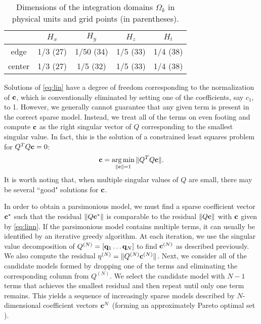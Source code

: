 \documentclass[
 reprint,
 amsmath,amssymb,
 aps,
]{revtex4-2}
\DeclareMathOperator*{\argmin}{arg\,min}
\begin{document}
\begin{table}
\begin{tabular}{*{5}{c}}
\hline & $H_x$ & $H_y$ & $H_z$ & $H_t$ \\ \hline
edge & 1/3 (27) & 1/50 (34) & 1/5 (33) & 1/4 (38) \\ 
center & 1/3 (27) & 1/5 (32) & 1/5 (33) & 1/4 (38) \\ \hline
\end{tabular}
\caption{Dimensions of the integration domains $\Omega_k$ in physical units and grid points (in parentheses).}
\label{tab:domain}
\end{table}

Solutions of \eqref{eq:lin} have a degree of freedom corresponding to the normalization of ${\bf c}$, which is conventionally eliminated by setting one of the coefficients, say $c_1$, to 1. However, we generally cannot guarantee that any given term is present in the correct sparse model. Instead, we treat all of the terms on even footing and compute ${\bf c}$ as the right singular vector of $Q$ corresponding to the smallest singular value.
In fact, this is the solution of a constrained least squares problem for $Q^TQ{\bf c}=0$:
\begin{equation}
{\bf c}=\argmin_{\|{\bf c}\|=1}\|Q^TQ{\bf c}\|.
\label{eq:linn}
\end{equation}
It is worth noting that, when multiple singular values of $Q$ are small, there may be several ``good" solutions for ${\bf c}$. 

In order to obtain a parsimonious model, we must find a sparse coefficient vector ${\bf c}^*$ such that the residual $\|Q{\bf c}^*\|$ is comparable to the residual $\|Q{\bf c}\|$ with ${\bf c}$ given by \eqref{eq:linn}. If the parsimonious model contains multiple terms, it can usually be identified by an iterative greedy algorithm. At each iteration, we use the singular value decomposition of $Q^{(N)} = [{\bf q}_1 \dots {\bf q}_N]$ to find ${\bf c}^{(N)}$ as described previously. We also compute the residual $\eta^{(N)} = \|Q^{(N)} {\bf c}^{(N)}\|$. Next, we consider all of the candidate models formed by dropping one of the terms and eliminating the corresponding column from $Q^{(N)}$. We select the candidate model with $N-1$ terms that achieves the smallest residual and then repeat until only one term remains. This yields a sequence of increasingly sparse models described by $N$-dimensional coefficient vectors ${\bf c}^N$ (forming an approximately Pareto optimal set \cite{miettinen2012}).
\end{document}
